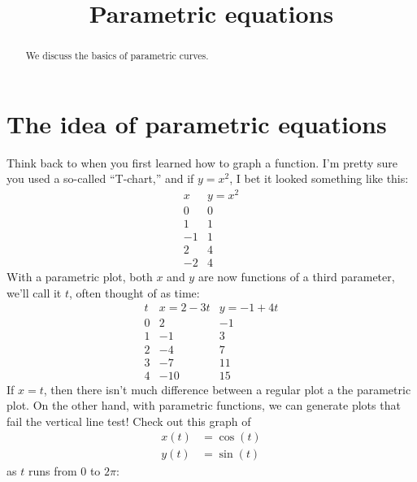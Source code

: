 \documentclass{ximera}
\title[Dig-In:]{Parametric equations}
\begin{document}
\begin{abstract}
  We discuss the basics of parametric curves.
\end{abstract}        
\maketitle

\section{The idea of parametric equations}

Think back to when you first learned how to graph a function. I'm
pretty sure you used a so-called ``T-chart,'' and if $y = x^2$, I bet it
looked something like this:
\[
\begin{array}{c|c}
  x & y = x^2\\\hline
  0 & 0 \\
  1 & 1\\
  -1 & 1\\
  2 & 4\\
  -2 & 4
\end{array}
\]
With a parametric plot, both $x$ and $y$ are now functions of a third
parameter, we'll call it $t$, often thought of as time:
\[
\begin{array}{c|c|c}
  t  & x = 2-3t & y = -1+4t\\\hline
  0  & 2  & -1 \\
  1  & -1 & 3 \\
  2  & -4 & 7 \\
  3  & -7 & 11\\
  4  & -10& 15
\end{array}
\]
If $x=t$, then there isn't much difference between a regular plot a
the parametric plot.  On the other hand, with parametric functions, we
can generate plots that fail the vertical line test! Check out this
graph of
\begin{align*}
x(t) &= \cos(t)\\
y(t) &= \sin(t)
\end{align*}
as $t$ runs from $0$ to $2\pi$:
\begin{image}
\end{image}
\end{document}
